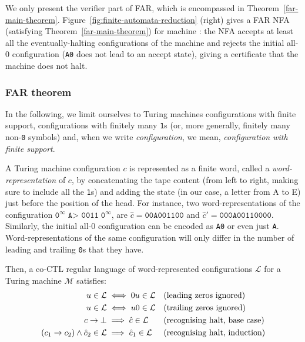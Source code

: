 We only present the verifier part of FAR, which is encompassed in Theorem~\ref{far-main-theorem}. Figure~\ref{fig:finite-automata-reduction} (right) gives a FAR NFA (\ie satisfying Theorem~\ref{far-main-theorem}) for machine : the NFA accepts at least all the eventually-halting configurations of the machine and rejects the initial all-0 configuration (\ie \texttt{A0} does not lead to an accept state), giving a certificate that the machine does not halt.

\subsubsection{FAR theorem}\label{sec:FAR:theorem}

In the following, we limit ourselves to Turing machines configurations with finite support, \ie configurations with finitely many \texttt{1}s (or, more generally, finitely many non-\texttt{0} symbols) and, when we write \textit{configuration}, we mean, \textit{configuration with finite support}.

A Turing machine configuration $c$ is represented as a finite word, called a \textit{word-representation} of $c$, by concatenating the tape content (from left to right, making sure to include all the \texttt{1}s) and adding the state (in our case, a letter from A to E) just before the position of the head. For instance, two word-representations of the configuration $\texttt{0}^\infty \; \texttt{A> 0011} \; \texttt{0}^\infty$, are $\hat{c} = \texttt{00A001100}$ and $\hat{c}' = \texttt{000A00110000}$. Similarly, the initial all-0 configuration can be encoded as \texttt{A0} or even just \texttt{A}. Word-representations of the same configuration will only differ in the number of leading and trailing \texttt{0}s that they have.


Then, a co-CTL regular language of word-represented configurations $\mathcal{L}$ for a Turing machine $\mathcal{M}$ satisfies:
\begin{align}
    u \in \mathcal{L}                               & \iff 0u \in \mathcal{L}           &  & \text{(leading zeros ignored)}
    \label{eq:lzignore}
    \\
    u \in \mathcal{L}                               & \iff u0 \in \mathcal{L}           &  & \text{(trailing zeros ignored)}
    \label{eq:tzignore}
    \\
    c\to\bot                                    & \implies \hat{c} \in \mathcal{L}  &  & \text{(recognising halt, base case)} \nonumber \\
    (c_1\to c_2)\land \hat{c}_2 \in \mathcal{L} & \implies\hat{c}_1 \in \mathcal{L} &  & \text{(recognising halt, induction)} \nonumber
\end{align}


